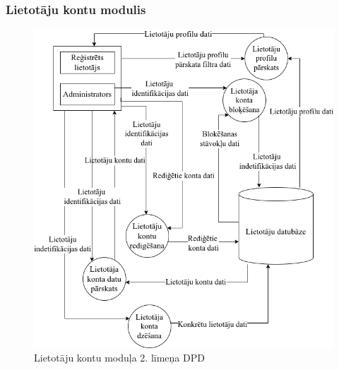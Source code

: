 \subsubsection{Lietotāju kontu modulis}

\begin{figure}[htbp]
	\centering
	\includegraphics[width=\linewidth]{./src/img/LietotājuKontuModulis.png}
	\caption{Lietotāju kontu moduļa 2. līmeņa DPD}
	\label{fig:dpd-2-user}
\end{figure}






